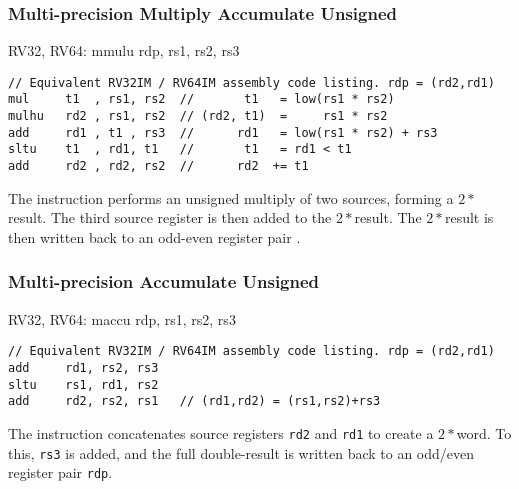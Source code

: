 
\subsubsection{Multi-precision Multiply Accumulate Unsigned}

\begin{isa}
RV32, RV64:
    mmulu   rdp, rs1, rs2, rs3
\end{isa}

\begin{lstlisting}[]
// Equivalent RV32IM / RV64IM assembly code listing. rdp = (rd2,rd1)
mul     t1  , rs1, rs2  //       t1   = low(rs1 * rs2)
mulhu   rd2 , rs1, rs2  // (rd2, t1)  =     rs1 * rs2
add     rd1 , t1 , rs3  //      rd1   = low(rs1 * rs2) + rs3
sltu    t1  , rd1, t1   //       t1   = rd1 < t1
add     rd2 , rd2, rs2  //      rd2  += t1
\end{lstlisting}

The  instruction performs an unsigned multiply
of two \XLEN sources, forming a $2*$\XLEN result.
The third \XLEN source register is then added to the $2*$\XLEN result.
The $2*$\XLEN result is then written back to an odd-even register
pair \rdp.


\subsubsection{Multi-precision Accumulate Unsigned}

\begin{isa}
RV32, RV64:
    maccu   rdp, rs1, rs2, rs3
\end{isa}

\begin{lstlisting}[]
// Equivalent RV32IM / RV64IM assembly code listing. rdp = (rd2,rd1)
add     rd1, rs2, rs3
sltu    rs1, rd1, rs2
add     rd2, rs2, rs1   // (rd1,rd2) = (rs1,rs2)+rs3
\end{lstlisting}

The  instruction concatenates source registers
{\tt rd2} and {\tt rd1} to create a $2*$\XLEN word.
To this, {\tt rs3} is added, and the full double-\XLEN result is written
back to an odd/even register pair {\tt rdp}.

